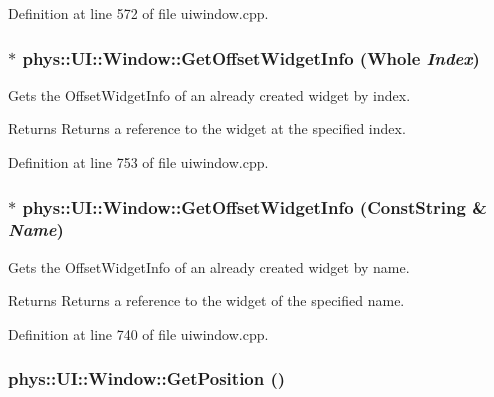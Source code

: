 Definition at line 572 of file uiwindow.cpp.

\hypertarget{classphys_1_1UI_1_1Window_a237b11a0dde5dc46856c96c61e6bb977}{
\subsubsection[{GetOffsetWidgetInfo}]{ $\ast$ phys::UI::Window::GetOffsetWidgetInfo ({\bf Whole} {\em Index})}}
\label{d4/d86/classphys_1_1UI_1_1Window_a237b11a0dde5dc46856c96c61e6bb977}


Gets the OffsetWidgetInfo of an already created widget by index. 

\begin{DoxyReturn}{Returns}
Returns a reference to the widget at the specified index. 
\end{DoxyReturn}


Definition at line 753 of file uiwindow.cpp.

\hypertarget{classphys_1_1UI_1_1Window_a77a2091e41766344253cac55af650f54}{
\subsubsection[{GetOffsetWidgetInfo}]{ $\ast$ phys::UI::Window::GetOffsetWidgetInfo ({\bf ConstString} \& {\em Name})}}
\label{d4/d86/classphys_1_1UI_1_1Window_a77a2091e41766344253cac55af650f54}


Gets the OffsetWidgetInfo of an already created widget by name. 

\begin{DoxyReturn}{Returns}
Returns a reference to the widget of the specified name. 
\end{DoxyReturn}


Definition at line 740 of file uiwindow.cpp.

\hypertarget{classphys_1_1UI_1_1Window_a29fca96d9a2dab29d77a36d6a329f306}{
\subsubsection[{GetPosition}]{ phys::UI::Window::GetPosition ()}}
\label{d4/d86/classphys_1_1UI_1_1Window_a29fca96d9a2dab29d77a36d6a329f306}


